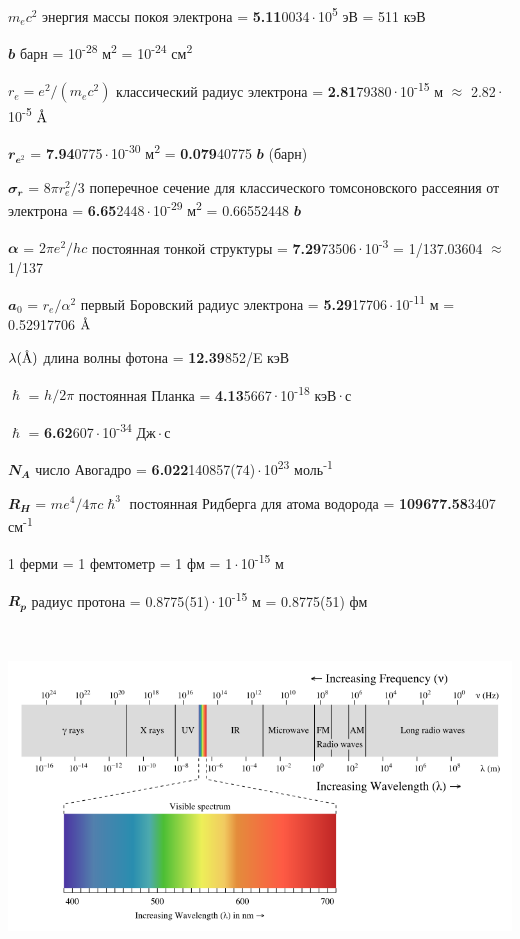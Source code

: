 \documentclass[a4paper,14pt, openany, twoside, draft]{extbook} %
\newcommand{\AAA}{\textup{\AA}}
\begin{document}
$m_ec^2$  энергия массы покоя электрона = \textbf{5.11}0034\,$\cdot$\,10\textsuperscript{5} эВ = 511 кэВ

$\mathbfit{b}$  барн = 10\textsuperscript{-28} м\textsuperscript{2} = 10\textsuperscript{-24} см\textsuperscript{2}

$r_e=e^2/(m_ec^2)$  классический радиус электрона = \textbf{2.81}79380\,$\cdot$\,10\textsuperscript{-15} м $\approx$ 2.82\,$\cdot$\,10\textsuperscript{-5} $\AAA$

$\mathbfit{r_{e^2}}$ = \textbf{7.94}0775\,$\cdot$\,10\textsuperscript{-30} м\textsuperscript{2}  = \textbf{0.079}40775 $\mathbfit{b}$ (барн)

$\mathbfit{\sigma_r}$ = $8\pi r_e^2/3$ поперечное сечение для классического томсоновского рассеяния от электрона = \textbf{6.65}2448\,$\cdot$\,10\textsuperscript{-29} м\textsuperscript{2} = 0.66552448 $\mathbfit{b}$

$\mathbfit{\alpha}$ = $2\pi e^2/hc$ постоянная тонкой структуры = \textbf{7.29}73506\,$\cdot$\,10\textsuperscript{-3} = 1/137.03604 $\approx$ 1/137

$\mathbfit{a_0}$ = $r_e/\alpha^2$ первый Боровский радиус электрона  = \textbf{5.29}17706\,$\cdot$\,10\textsuperscript{-11} м = 0.52917706 $\AAA$

$\lambda(\AAA)$  длина волны фотона = \textbf{12.39}852/E кэВ

$\mathbfit{\hslash}$ = $h/2\pi$ постоянная Планка = \textbf{4.13}5667\,$\cdot$\,10\textsuperscript{-18} кэВ\,$\cdot$\,с

$\mathbfit{\hslash}$ = \textbf{6.62}607\,$\cdot$\,10\textsuperscript{-34} Дж\,$\cdot$\,с

$\mathbfit{N_A}$  число Авогадро = \textbf{6.022}140857(74)\,$\cdot$\,10\textsuperscript{23} моль\textsuperscript{-1}

$\mathbfit{R_H}$ = $me^4/4\pi c\hslash^3$ постоянная Ридберга для атома водорода = \textbf{109677.58}3407 см\textsuperscript{-1}

1 ферми = 1 фемтометр = 1 фм = 1\,$\cdot$\,10\textsuperscript{-15} м

$\mathbfit{R_p}$ радиус протона = 0.8775(51)\,$\cdot$\,10\textsuperscript{-15} м = 0.8775(51) фм

\clearpage{}
 \includegraphics[width=16.866cm,height=9.022cm]{EMRad-img001.png}
\end{document}
